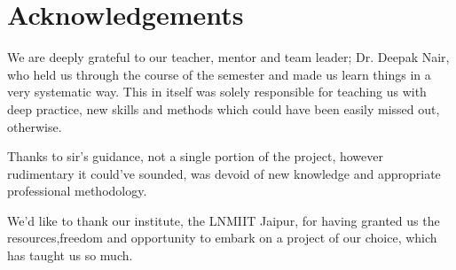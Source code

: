 \chapter{Acknowledgements}
We are deeply grateful to our teacher, mentor and team leader; Dr. Deepak Nair, who held us through the course of the semester and made us learn things in a very systematic way. This in itself was solely responsible for teaching us with deep practice, new skills and methods which could have been easily missed out, otherwise. \vspace{1cm}

Thanks to sir's guidance, not a single portion of the project, however rudimentary it could've sounded, was devoid of new knowledge and appropriate professional methodology. \vspace{1cm}

We'd like to thank our institute, the LNMIIT Jaipur, for having granted us the resources,freedom and opportunity to embark on a project of our choice, which has taught us so much. \clearpage